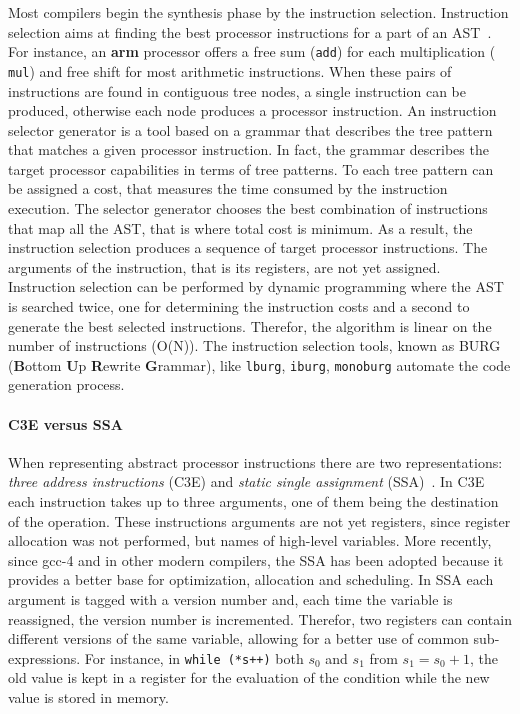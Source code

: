 Most compilers begin the synthesis phase by the instruction selection.
Instruction selection aims at finding the best processor instructions for a part
of an {\sc AST}~\cite{cooper03,Fraser:burg,Proebsting:2002}.  For instance, an
{\bf arm} processor offers a free sum ({\tt add}) for each multiplication ({\tt
  mul}) and free shift for most arithmetic instructions.  When these pairs of
instructions are found in contiguous tree nodes, a single instruction can be
produced, otherwise each node produces a processor instruction.
An instruction selector generator is a tool based on a grammar that describes
the tree pattern that matches a given processor instruction.  In fact, the
grammar describes the target processor capabilities in terms of tree patterns.
To each tree pattern can be assigned a cost, that measures the time consumed by
the instruction execution.  The selector generator chooses
the best combination of instructions that map all the {\sc AST}, that is where
total cost is minimum.  As a result, the instruction selection produces a
sequence of target processor instructions.  The arguments of the instruction,
that is its registers, are not yet assigned.
Instruction selection can be performed by dynamic programming where the {\sc AST}
is searched twice, one for determining the instruction costs and a second to generate
the best selected instructions.
Therefor, the algorithm is linear on the number of instructions (O(N)).
The instruction selection tools, known as {\sc BURG} ({\bf B}ottom {\bf U}p
{\bf R}ewrite {\bf G}rammar), like {\tt lburg}, {\tt iburg}, {\tt monoburg}
automate the code generation process.


\paragraph{{\sc C3E} versus {\sc SSA}}

When representing abstract processor instructions there are two representations:
{\em three address instructions} ({\sc C3E}) and {\em static single assignment}
({\sc SSA})~\cite{appel08,parsons92}.
In {\sc C3E} each instruction takes up to three arguments, one of
them being the destination of the operation.  These instructions arguments are
not yet registers, since register allocation was not performed, but names of
high-level variables.  More recently, since {\sc gcc-4} and in other modern
compilers, the {\sc SSA} has been adopted because it provides a better base for
optimization, allocation and scheduling.  In {\sc SSA} each argument is tagged
with a version number and, each time the variable is reassigned, the version
number is incremented.  Therefor, two registers can contain different versions
of the same variable, allowing for a better use of common sub-expressions.
For instance, in {\tt while (*s++)} both $s_0$ and $s_1$ from $s_1 = s_0 + 1$, the old value is kept in a register for the evaluation of the condition while the new value is stored in memory.

